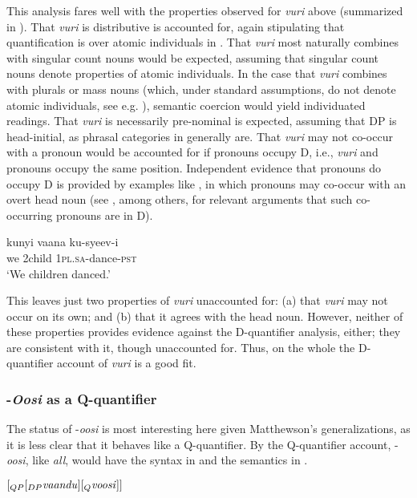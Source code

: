 \documentclass[output=paper]{langsci/langscibook}
\begin{document}
This analysis fares well with the properties observed for \textit{vuri} above (summarized in ). That \textit{vuri} is distributive is accounted for, again stipulating that quantification is over atomic individuals in . That \textit{vuri} most naturally combines with singular count nouns would be expected, assuming that singular count nouns denote properties of atomic individuals. In the case that \textit{vuri} combines with plurals or mass nouns (which, under standard assumptions, do not denote atomic individuals, see e.g. \citealt{Link1983}), semantic coercion would yield individuated readings. That \textit{vuri} is necessarily pre-nominal is expected, assuming that DP is head-initial, as phrasal categories in  generally are. That \textit{vuri} may not co-occur with a pronoun would be accounted for if pronouns occupy D, i.e., \textit{vuri} and pronouns occupy the same position. Independent evidence that  pronouns do occupy D is provided by examples like , in which pronouns may co-occur with an overt head noun (see \citealt{Postal1966}, among others, for relevant arguments that such co-occurring pronouns are in D).

\ea\label{ex:landman:20}
\gll kunyi  vaana    ku-syeev-i\\
     we  2child    1\textsc{pl}.\textsc{sa}-dance-\textsc{pst}  \\
\glt ‘We children danced.’
\z

  This leaves just two properties of \textit{vuri} unaccounted for: (a) that \textit{vuri} may not occur on its own; and (b) that it agrees with the head noun. However, neither of these properties provides evidence against the D-quantifier analysis, either; they are consistent with it, though unaccounted for. Thus, on the whole the D-quantifier account of \textit{vuri} is a good fit.

\subsubsection{-\textit{Oosi} as a Q-quantifier}

The status of -\textit{oosi} is most interesting here given Matthewson's generalizations, as it is less clear that it behaves like a Q-quantifier. By the Q-quantifier account, -\textit{oosi}, like  \textit{all}, would have the syntax in  and the semantics in .

\ea\label{ex:landman:21}
$[_{QP} [_{ DP} \text{\textit{vaandu}}] [_{Q} \text{\textit{voosi}}]]$
\z
\end{document}
